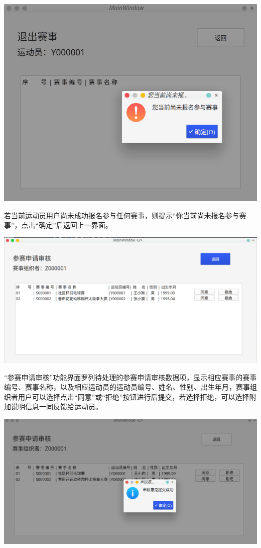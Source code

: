 \documentclass[a4paper,UTF8]{article}
\begin{document}
{\centering\includegraphics[width=1\columnwidth]{16.png}
	
}

若当前运动员用户尚未成功报名参与任何赛事，则提示“你当前尚未报名参与赛事”，点击“确定”后返回上一界面。

{\centering\includegraphics[width=1\columnwidth]{18.png}
	
}

“参赛申请审核”功能界面罗列待处理的参赛申请审核数据项，显示相应赛事的赛事编号、赛事名称，以及相应运动员的运动员编号、姓名、性别、出生年月，赛事组织者用户可以选择点击“同意”或“拒绝”按钮进行后提交，若选择拒绝，可以选择附加说明信息一同反馈给运动员。

{\centering\includegraphics[width=1\columnwidth]{17.png}
	
}
\end{document}
